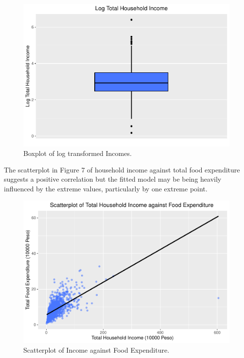 \documentclass[
]{article}
\begin{document}
\begin{figure}[H]

{\centering \includegraphics[width=0.8\linewidth]{Group_01_Project2_demo_files/figure-latex/balance boxplot2-1} 

}

\caption{Boxplot of log transformed Incomes.}\label{fig:balance boxplot2}
\end{figure}

The scatterplot in Figure 7 of household income against total food
expenditure suggests a positive correlation but the fitted model may be
being heavily influenced by the extreme values, particularly by one
extreme point.

\begin{figure}[H]

{\centering \includegraphics[width=0.8\linewidth]{Group_01_Project2_demo_files/figure-latex/balance_plot-1} 

}

\caption{Scatterplot of Income against Food Expenditure.}\label{fig:balance_plot}
\end{figure}
\end{document}
